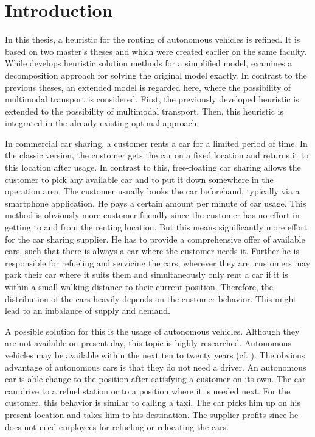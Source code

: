 \chapter{Introduction}

In this thesis, a heuristic for the routing of autonomous vehicles is refined. It is based on two master's theses \cite{Kaiser} and \cite{Knoll} which were created earlier on the same faculty. While \cite{Knoll} develops heuristic solution methods for a simplified model, \cite{Kaiser} examines a decomposition approach for solving the original model exactly. In contrast to the previous theses, an extended model is regarded here, where the possibility of multimodal transport is considered. First, the previously developed heuristic is extended to the possibility of multimodal transport. Then, this heuristic is integrated in the already existing optimal approach.

In commercial car sharing, a customer rents a car for a limited period of time. In the classic version, the customer gets the car on a fixed location and returns it to this location after usage. In contrast to this, free-floating car sharing allows the customer to pick any available car and to put it down somewhere in the operation area. The customer usually books the car beforehand, typically via a smartphone application. He pays a certain amount per minute of car usage. This method is obviously more customer-friendly since the customer has no effort in getting to and from the renting location. But this means significantly more effort for the car sharing supplier. He has to provide a comprehensive offer of available cars, such that there is always a car where the customer needs it. Further he is responsible for refueling and servicing the cars, wherever they are. customers may park their car where it suits them and simultaneously only rent a car if it is within a small walking distance to their current position. Therefore, the distribution of the cars heavily depends on the customer behavior. This might lead to an imbalance of supply and demand.

A possible solution for this is the usage of autonomous vehicles. Although they are not available on present day, this topic is highly researched. Autonomous vehicles may be available within the next ten to twenty years (cf. \cite{Hauser}). The obvious advantage of autonomous cars is that they do not need a driver. An autonomous car is able change to the position after satisfying a customer on its own. The car can drive to a refuel station or to a position where it is needed next. For the customer, this behavior is similar to calling a taxi. The car picks him up on his present location and takes him to his destination. The supplier profits since he does not need employees for refueling or relocating the cars.

